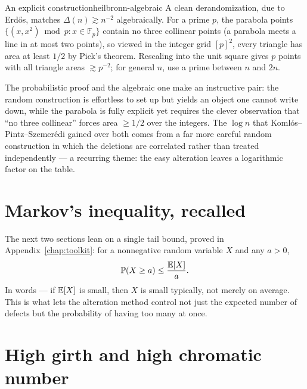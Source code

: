 \begin{remark}{An explicit construction}{heilbronn-algebraic}
A clean derandomization, due to Erd\H{o}s, matches $\Delta(n)\gtrsim n^{-2}$
algebraically. For a prime $p$, the parabola points
$\{(x,x^2)\bmod p : x\in\mathbb F_p\}$ contain no three collinear points (a
parabola meets a line in at most two points), so viewed in the integer grid
$[p]^2$, every triangle has area at least $1/2$ by Pick's theorem. Rescaling
into the unit square gives $p$ points with all triangle areas
$\gtrsim p^{-2}$; for general $n$, use a prime between $n$ and $2n$.
\end{remark}

\begin{insight}
The probabilistic proof and the algebraic one make an instructive pair: the
random construction is effortless to set up but yields an object one cannot
write down, while the parabola is fully explicit yet requires the clever
observation that ``no three collinear'' forces area $\ge1/2$ over the integers.
The $\log n$ that Koml\'os--Pintz--Szemer\'edi gained over both comes from a far
more careful random construction in which the deletions are correlated rather
than treated independently --- a recurring theme: the easy alteration leaves a
logarithmic factor on the table.
\end{insight}

\section{Markov's inequality, recalled}

The next two sections lean on a single tail bound, proved in
Appendix~\ref{chap:toolkit}: for a nonnegative random variable $X$ and any
$a>0$,
\[
  \mathbb{P}(X\ge a)\le\frac{\mathbb{E}[X]}{a}.
\]
In words --- if $\mathbb{E}[X]$ is small, then $X$ is small typically, not merely on
average. This is what lets the alteration method control not just the expected
number of defects but the probability of having too many at once.

\section{High girth and high chromatic number}

